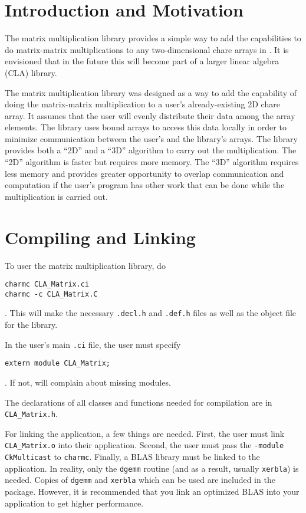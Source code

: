 \section{Introduction and Motivation}
The matrix multiplication library provides a simple way to add the capabilities
to do matrix-matrix multiplications to any two-dimensional chare arrays in
\charmpp. It is envisioned that in the future this will become part of a
larger \charmpp linear algebra (CLA) library.

The matrix multiplication library was designed as a way to add the capability
of doing the matrix-matrix multiplication to a user's already-existing 2D chare
array. It assumes that the user will evenly distribute their data among the
array elements. The library uses bound arrays to access this data locally in
order to minimize communication between the user's and the library's arrays.
The library provides both a ``2D'' and a ``3D'' algorithm to carry out the
multiplication. The ``2D'' algorithm is faster but requires more memory. The
``3D'' algorithm requires less memory and provides greater opportunity to
overlap communication and computation if the user's program has other work that
can be done while the multiplication is carried out.



\section{Compiling and Linking}
To user the matrix multiplication library, do
\begin{verbatim}
charmc CLA_Matrix.ci
charmc -c CLA_Matrix.C
\end{verbatim}
. This will make the necessary {\tt .decl.h} and {\tt .def.h} files as well
as the object file for the library.

In the user's main {\tt .ci} file, the user must specify
\begin{verbatim}
extern module CLA_Matrix;
\end{verbatim}
. If not, \charmpp will complain about missing modules.

The declarations of all classes and functions needed for compilation are in
{\tt CLA\_Matrix.h}.

For linking the application, a few things are needed. First, the user must link
{\tt CLA\_Matrix.o} into their application. Second, the user must pass the
{\tt -module CkMulticast} to {\tt charmc}. Finally, a BLAS library must be
linked to the application. In reality, only the {\tt dgemm} routine (and as
a result, usually {\tt xerbla}) is needed. Copies of {\tt dgemm} and
{\tt xerbla} which can be used are included in the package. However, it is
recommended that you link an optimized BLAS into your application to get
higher performance.


